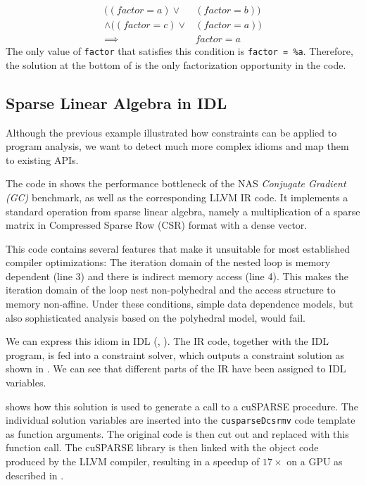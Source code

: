 \begin{equation}
\begin{split}
((factor = a) \lor & (factor = b)) \\\land ((factor = c) \lor & (factor = a)) \\
\implies & factor = a 
\end{split}
\nonumber
\end{equation}
The only value of {\tt factor} that satisfies this condition is {\tt factor = \%a}.
Therefore, the solution at the bottom of  is the only factorization opportunity in the code.

\begin{figure}[p]
    
\end{figure}

\subsection{Sparse Linear Algebra in IDL}

    Although the previous example illustrated how constraints can be applied to 
    program analysis, we want to detect much more complex idioms and 
    map them to existing APIs.

    The code in  shows the performance bottleneck of
    the NAS \emph{Conjugate Gradient (GC)} benchmark, as well as the
    corresponding LLVM IR code.
    It implements a standard operation from sparse linear algebra, namely a
    multiplication of a sparse matrix in Compressed Sparse Row (CSR) format with
    a dense vector.

    This code contains several features that make it unsuitable for most
    established compiler optimizations:
    The iteration domain of the nested loop is memory dependent (line 3) and
    there is indirect memory access (line 4).
    This makes the iteration domain of the loop nest non-polyhedral and the
    access structure to memory non-affine.
    Under these conditions, simple data dependence models, but also
    sophisticated analysis based on the polyhedral model, would fail.

    We can express this idiom in IDL (, ).
    The IR code, together with the IDL program, is fed into a constraint solver,
    which outputs a constraint solution as shown in .
    We can see that different parts of the IR have been assigned to IDL
    variables.

     shows how this solution is used to generate a
    call to a cuSPARSE procedure.
    The individual solution variables are inserted into the {\tt cusparseDcsrmv}
    code template as function arguments. 
    The original code is then cut out and replaced with this function call.
    The cuSPARSE library is then linked with the object code produced by the
    LLVM compiler, resulting in a speedup of $17\times$ on a GPU as described in
    .

